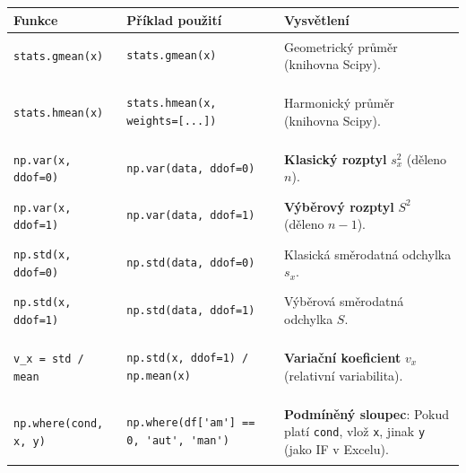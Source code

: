 \documentclass[a4paper, 11pt]{article}
\newenvironment{funkcedict}
{%
  \begingroup
  \renewcommand{\arraystretch}{1.4}%
  \lstset{basicstyle=\ttfamily\small, columns=fullflexible}%
  \setlength{\tabcolsep}{4pt}%
  \begin{tabular}{p{0.19\textwidth} p{0.38\textwidth} p{0.30\textwidth}}
  \textbf{Funkce} & \textbf{Příklad použití} & \textbf{Vysvětlení} \\
  \midrule
}
{%
  \end{tabular}%
  \endgroup
}
\begin{document}
			\begin{funkcedict}
				\texttt{stats.gmean(x)} &
				\begin{lstlisting}
stats.gmean(x)
				\end{lstlisting}
				& Geometrický průměr (knihovna Scipy). \\
				\texttt{stats.hmean(x)} &
				\begin{lstlisting}
stats.hmean(x, weights=[...])
				\end{lstlisting}
				& Harmonický průměr (knihovna Scipy). \\
				\texttt{np.var(x, ddof=0)} &
				\begin{lstlisting}
np.var(data, ddof=0)
				\end{lstlisting}
				& \textbf{Klasický rozptyl} $s_x^2$ (děleno $n$). \\
				\texttt{np.var(x, ddof=1)} &
				\begin{lstlisting}
np.var(data, ddof=1)
				\end{lstlisting}
				& \textbf{Výběrový rozptyl} $S^2$ (děleno $n-1$). \\
				\texttt{np.std(x, ddof=0)} &
				\begin{lstlisting}
np.std(data, ddof=0)
				\end{lstlisting}
				& Klasická směrodatná odchylka $s_x$. \\
				\texttt{np.std(x, ddof=1)} &
				\begin{lstlisting}
np.std(data, ddof=1)
				\end{lstlisting}
				& Výběrová směrodatná odchylka $S$. \\
				\texttt{v\_x = std / mean} &
				\begin{lstlisting}
np.std(x, ddof=1) / np.mean(x)
				\end{lstlisting}
				& \textbf{Variační koeficient} $v_x$ (relativní variabilita). \\
				\texttt{np.where(cond, x, y)} &
				\begin{lstlisting}
np.where(df['am'] == 0, 'aut', 'man')
				\end{lstlisting}
				& \textbf{Podmíněný sloupec}: Pokud platí \texttt{cond}, vlož \texttt{x}, jinak \texttt{y} (jako IF v Excelu). \\
			\end{funkcedict}

			\clearpage
\end{document}
